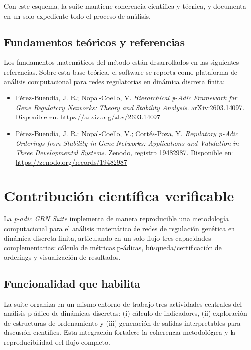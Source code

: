 \documentclass[11pt]{article}
\begin{document}
Con este esquema, la suite mantiene coherencia científica y técnica, y documenta en un solo expediente todo el proceso de análisis.

\subsection*{Fundamentos teóricos y referencias}
Los fundamentos matemáticos del método están desarrollados en las siguientes referencias. Sobre esta base teórica, el software se reporta como plataforma de análisis computacional para redes regulatorias en dinámica discreta finita:
\begin{itemize}
  \item Pérez-Buendía, J. R.; Nopal-Coello, V. \emph{Hierarchical p-Adic Framework for Gene Regulatory Networks: Theory and Stability Analysis}. arXiv:2603.14097. Disponible en: \url{https://arxiv.org/abs/2603.14097}
  \item Pérez-Buendía, J. R.; Nopal-Coello, V.; Cortés-Poza, Y. \emph{Regulatory p-Adic Orderings from Stability in Gene Networks: Applications and Validation in Three Developmental Systems}. Zenodo, registro 19482987. Disponible en: \url{https://zenodo.org/records/19482987}
\end{itemize}

\section{Contribución científica verificable}
La \emph{p-adic GRN Suite} implementa de manera reproducible una metodología
computacional para el análisis matemático de redes de regulación genética en
dinámica discreta finita, articulando en un solo flujo tres capacidades
complementarias: cálculo de métricas p-ádicas, búsqueda/certificación de
orderings y visualización de resultados.

\subsection*{Funcionalidad que habilita}
La suite organiza en un mismo entorno de trabajo tres actividades centrales del
análisis p-ádico de dinámicas discretas: (i) cálculo de indicadores, (ii)
exploración de estructuras de ordenamiento y (iii) generación de salidas
interpretables para discusión científica. Esta integración fortalece la
coherencia metodológica y la reproducibilidad del flujo completo.
\end{document}
